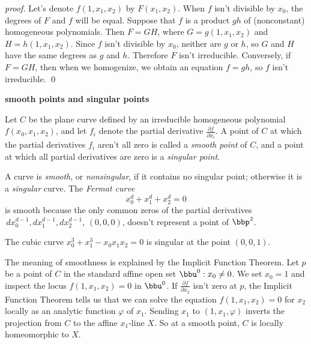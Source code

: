 \documentclass[leqno]{book}
\newcommand\Marginnote[1]{\marginnote{\hspace{-12pt}\normalfont{#1}}}
\renewcommand\theequation{\thesection.\arabic{equation}}
\newenvironment{boldequation}{\renewcommand\theequation{\textbf{\thesection.\arabic{equation}}}\equation}
   {\endequation}
\theoremstyle{definition}%
\numberwithin{equation}{section}
\theoremstyle{theorem} %
\renewenvironment{proof}{\no \emph{proof.}}{}
\begin{document}
\ms
\begin{proof} Let's
 denote  $f(1,x_1,x_2)$  by $F(x_1,x_2)$.  
When $f$ isn't
 divisible by $x_0$, the degrees of $F$ and $f$ will be equal.
 Suppose that $f$ is a product $gh$ of (nonconstant) homogeneous
 polynomials.  Then $F = GH$, where $G = g(1,x_1,x_2)$ and $H =
 h(1,x_1,x_2)$.  Since $f$ isn't divisible by $x_0$, neither are $g$
 or $h$, so $G$ and $H$ have the same degrees as $g$ and $h$.
Therefore $F$ isn't irreducible.
Conversely, if $F= GH$, then when we homogenize, we obtain
an equation $f=gh$, so $f$ isn't irreducible.
\qed\end{proof}

\begin{boldequation}\Marginnote{smsingpts}
\hspace{-7.5cm} \textbf{smooth points and singular points} 
\label{smsingpts}\end{boldequation}


\ms Let $C$ be the plane curve defined by an irreducible homogeneous
polynomial $f(x_0,x_1,x_2)$, and let $f_i$ denote the partial
derivative $\frac {\partial f}{\partial x_i}$.  A point of $C$ at
which the partial derivatives $f_i$ aren't all zero is called a {\it
  smooth point} of $C$, and a point at which all partial derivatives
are zero is a {\it singular point}.

 A curve  is  {\it smooth}, or {\it nonsingular}, if it
contains no singular point; otherwise it is a {\it singular} curve.
The {\it Fermat curve} \Marginnote{fermatcurve}
\begin{equation} x_0^d+x_1^d+x_2^d=0 
\label{fermatcurve}
\end{equation} is smooth because the only common zeros of the
 partial derivatives $\,dx_0^{d-1},dx_1^{d-1},dx_2^{d-1}$, $(0,0,0)$,
 doesn't represent a point of $\bbp^2$.  

The cubic curve
 $x_0^3+x_1^3-x_0x_1x_2=0$ is singular at the point $(0,0,1)$.

\ms The meaning of smoothness is explained by the Implicit Function
Theorem.  Let $p$ be a point of $C$ in the standard affine open set
$\bbu^0:x_0\neq 0$.
We set $x_0=1$ and inspect the locus
$f(1,x_1,x_2)=0$ in $\bbu^0$. If $\frac {\partial f}{\partial
  x_2}$ isn't zero at $p$, the Implicit Function Theorem tells us
that we can solve the equation $f(1,x_1,x_2)=0$ for $x_2$ locally as
an analytic function $\varphi$ of $x_1$.  Sending $x_1$ to
$(1,x_1,\varphi)$ inverts the projection from $C$ to the affine
$x_1$-line $X$.  So at a smooth point, $C$ is locally homeomorphic to $X$.
\end{document}
